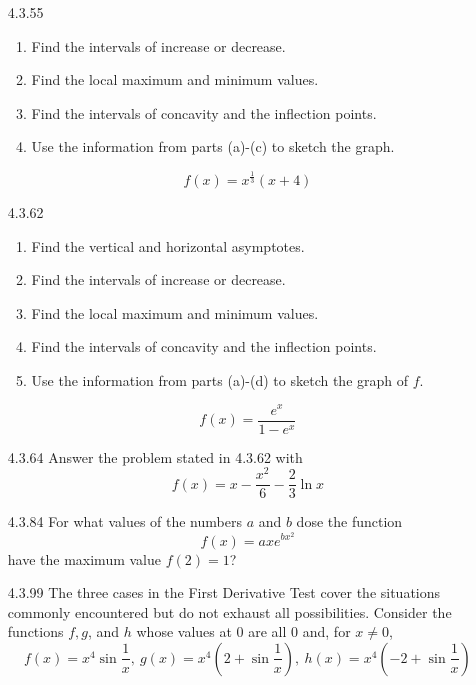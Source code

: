 \documentclass{article}
\begin{document}
\begin{enumerate}
\newpage

\item[4.3.55]
    \begin{enumerate}
        \item Find the intervals of increase or decrease.
        \item Find the local maximum and minimum values.
        \item Find the intervals of concavity and the inflection points.
        \item Use the information from parts (a)-(c) to sketch the graph.
    \end{enumerate}
    \[
        f(x) = x^{\frac{1}{3}} (x + 4)
    \]

\vspace{8cm}

\item[4.3.62]
    \begin{enumerate}
        \item Find the vertical and horizontal asymptotes.
        \item Find the intervals of increase or decrease.
        \item Find the local maximum and minimum values.
        \item Find the intervals of concavity and the inflection points.
        \item Use the information from parts (a)-(d) to sketch the graph of $f$.
    \end{enumerate}
    \[
        f(x) = \frac{e^{x}}{1-e^{x}}
    \]

\newpage

\item[4.3.64]
    Answer the problem stated in 4.3.62 with
    \[
        f(x) = x - \frac{x^{2}}{6} - \frac{2}{3} \ln x
    \]

\vspace{8cm}

\item[4.3.84]
    For what values of the numbers $a$ and $b$ dose the function
    \[
        f(x) = axe^{bx^{2}}
    \]
    have the maximum value $f(2) = 1$?

\newpage

\item[4.3.99]
    The three cases in the First Derivative Test cover the situations
    commonly encountered but do not exhaust all possibilities.
    Consider the functions $f,g$, and $h$ whose values at $0$ are all
    $0$ and, for $x \neq 0$,
    \[
        f(x) = x^{4} \sin \frac{1}{x} ,\
        g(x) = x^{4} \left( 2+\sin \frac{1}{x}  \right),\
        h(x) = x^{4} \left( -2 + \sin \frac{1}{x}  \right)
    \]


\end{enumerate}
\end{document}
